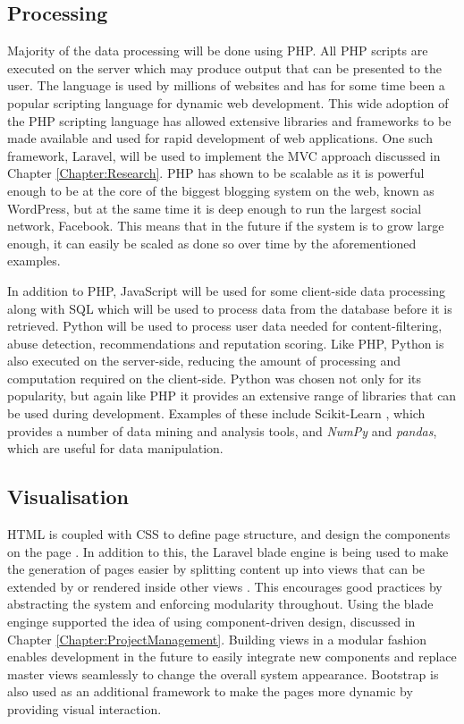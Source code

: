 \subsection{Processing}
Majority of the data processing will be done using PHP. All PHP scripts are executed on the server which may produce output that can be presented to the user. The language is used by millions of websites and has for some time been  a popular scripting language for dynamic web development. This wide adoption of the PHP scripting language has allowed extensive libraries and frameworks to be made available and used for rapid development of web applications. One such framework, Laravel, will be used to implement the MVC approach discussed in Chapter \ref{Chapter:Research}. PHP has shown to be scalable as it is powerful enough to be at the core of the biggest blogging system on the web, known as WordPress, but at the same time it is deep enough to run the largest social network, Facebook\cite{W3Schools:PHP_Intro, Wiki:WordPress, Fastcompany:Facebook_PHP}. This means that in the future if the system is to grow large enough, it can easily be scaled as done so over time by the aforementioned examples. 

In addition to PHP, JavaScript will be used for some client-side data processing along with SQL which will be used to process data from the database before it is retrieved. Python will be used to process user data needed for content-filtering, abuse detection, recommendations and reputation scoring. Like PHP, Python is also executed on the server-side, reducing the amount of processing and computation required on the client-side. Python was chosen not only for its popularity, but again like PHP it provides an extensive range of libraries that can be used during development. Examples of these include Scikit-Learn \cite{scikit:home}, which provides a number of data mining and analysis tools, and \emph{NumPy} and \emph{pandas}, which are useful for data manipulation.

\subsection{Visualisation}
HTML is coupled with CSS to define page structure, and design the components on the page \cite{W3:HTML5, W3:CSS}. In addition to this, the Laravel blade engine is being used to make the generation of pages easier by splitting content up into views that can be extended by or rendered inside other views \cite{Laravel:Blade}. This encourages good practices by abstracting the system and enforcing modularity throughout. Using the blade enginge supported the idea of using component-driven design, discussed in Chapter \ref{Chapter:ProjectManagement}. Building views in a modular fashion enables development in the future to easily integrate new components and replace master views seamlessly to change the overall system appearance. Bootstrap is also used as an additional framework to make the pages more dynamic by providing visual interaction.

